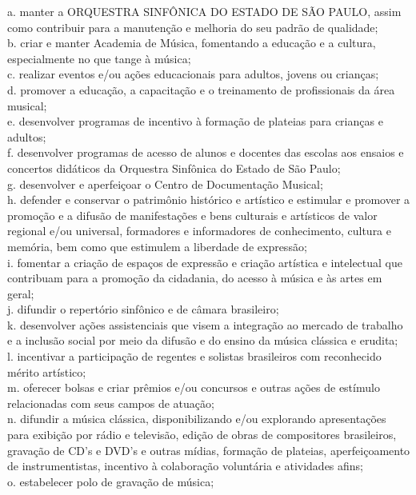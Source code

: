 \documentclass[a4paper, 12pt, openright, oneside, german, french, english, brazil]{abntex2}
\begin{document}
	\begin{citacao}
		a. manter a ORQUESTRA SINFÔNICA DO ESTADO DE SÃO PAULO, assim como contribuir para a manutenção e melhoria do seu padrão de qualidade;\\
		b. criar e manter Academia de Música, fomentando a educação e a cultura, especialmente no que tange à música;\\
		c. realizar eventos e/ou ações educacionais para adultos, jovens ou crianças;\\
		d. promover a educação, a capacitação e o treinamento de profissionais da área musical;\\
		e. desenvolver programas de incentivo à formação de plateias para crianças e adultos;\\
		f. desenvolver programas de acesso de alunos e docentes das escolas aos ensaios e concertos didáticos da Orquestra Sinfônica do Estado de São Paulo;\\
		g. desenvolver e aperfeiçoar o Centro de Documentação Musical;\\
		h. defender e conservar o patrimônio histórico e artístico e estimular e promover a promoção e a difusão de manifestações e bens culturais e artísticos de valor regional e/ou universal, formadores e informadores de conhecimento, cultura e memória, bem como que estimulem a liberdade de expressão;\\
		i. fomentar a criação de espaços de expressão e criação artística e intelectual que contribuam para a promoção da cidadania, do acesso à música e às artes em geral;\\
		j. difundir o repertório sinfônico e de câmara brasileiro;\\
		k. desenvolver ações assistenciais que visem a integração ao mercado de trabalho e a inclusão social por meio da difusão e do ensino da música clássica e erudita;\\
		l. incentivar a participação de regentes e solistas brasileiros com reconhecido mérito artístico;\\
		m. oferecer bolsas e criar prêmios e/ou concursos e outras ações de estímulo relacionadas com seus campos de atuação;\\
		n. difundir a música clássica, disponibilizando e/ou explorando apresentações para exibição por rádio e televisão, edição de obras de compositores brasileiros, gravação de CD's e DVD's e outras mídias, formação de plateias, aperfeiçoamento de instrumentistas, incentivo à colaboração voluntária e atividades afins;\\
		o. estabelecer polo de gravação de música;\\

\end{citacao}
\end{document}
